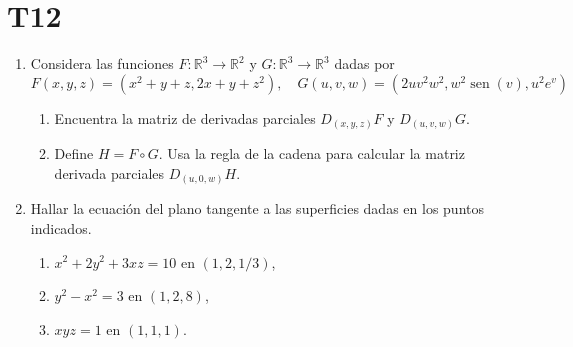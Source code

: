 \documentclass{article}
\theoremstyle{definition}
\newcommand{\sen}{\operatorname{sen}}
\begin{document}
  \section*{T12 }
  \begin{enumerate}
  

    
  \item Considera las funciones $F:\mathbb{R}^3\to \mathbb{R}^2$ y $G:\mathbb{R}^3\to \mathbb{R}^3$ dadas
    por
    $$
    F(x,y,z)=(x^2+y+z, 2x+y+z^2), \quad G(u,v,w)=(2uv^2w^2,w^2\sen(v),u^2e^v)
    $$
    \begin{enumerate}
    \item Encuentra la matriz de derivadas parciales $D_{(x,y,z)}F$ y $D_{(u,v,w)}G$.
    \item Define $H=F\circ G$. Usa la regla de la cadena para calcular la matriz derivada
      parciales $D_{(u,0,w)}H$.
    \end{enumerate}


    
  \item Hallar la ecuaci\'on del plano tangente a las superficies
    dadas en los puntos indicados.
    \begin{enumerate}
    \item $x^2+2y^2+3xz=10$ en $(1,2,1/3)$,
    \item $y^2-x^2=3$ en $(1,2,8)$,
    \item $xyz=1$ en $(1,1,1)$.
    \end{enumerate}







\end{enumerate}
\end{document}
